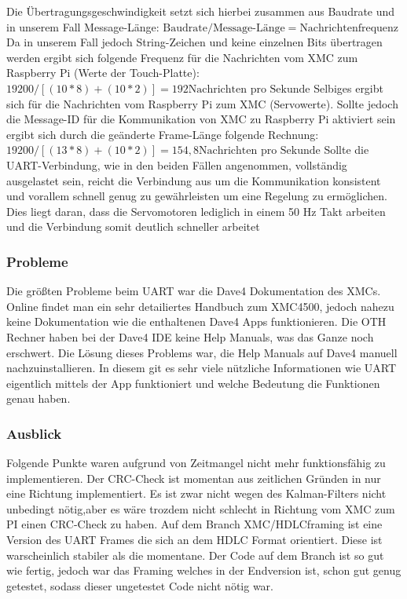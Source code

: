 \documentclass[12pt,a4paper,bibliography=totoc,listof=totoc]{scrartcl}
\begin{document}
Die Übertragungsgeschwindigkeit setzt sich hierbei zusammen aus Baudrate und in unserem Fall Message-Länge:\newline
$\text{Baudrate}/ \text{Message-Länge} = \text {Nachrichtenfrequenz} $\newline
Da in unserem Fall jedoch String-Zeichen und keine einzelnen Bits übertragen werden ergibt sich folgende Frequenz für 
die Nachrichten vom XMC zum Raspberry Pi (Werte der Touch-Platte):\newline
$ 19200/[(10*8)+(10*2)]= 192 \text {Nachrichten pro Sekunde}$\newline
Selbiges ergibt sich für die Nachrichten vom Raspberry Pi zum XMC (Servowerte). Sollte jedoch die Message-ID für die Kommunikation 
von XMC zu Raspberry Pi aktiviert sein ergibt sich durch die geänderte Frame-Länge folgende Rechnung:\newline
$19200 /[(13*8)+(10*2)]=154,8\text {Nachrichten pro Sekunde}$ \newline
Sollte die UART-Verbindung, wie in den beiden Fällen angenommen, vollständig ausgelastet sein, reicht die Verbindung aus um die 
Kommunikation konsistent und vorallem schnell genug zu gewährleisten um eine Regelung zu ermöglichen. Dies liegt daran, dass die 
Servomotoren lediglich in einem 50 Hz Takt arbeiten und die Verbindung somit deutlich schneller arbeitet


\subsubsection{Probleme}
Die größten Probleme beim UART war die Dave4 Dokumentation des XMCs. Online findet man ein sehr detailiertes Handbuch zum 
XMC4500, jedoch nahezu keine Dokumentation wie die enthaltenen Dave4 Apps funktionieren. Die OTH Rechner haben bei der Dave4 IDE keine 
Help Manuals, was das Ganze noch erschwert. Die Lösung dieses Problems war, die Help Manuals auf Dave4 manuell 
nachzuinstallieren. In diesem git es sehr viele nützliche Informationen wie UART eigentlich mittels der App funktioniert und welche Bedeutung die Funktionen genau haben.

\subsubsection{Ausblick}
Folgende Punkte waren aufgrund von Zeitmangel nicht mehr funktionsfähig zu implementieren.
Der CRC-Check ist momentan aus zeitlichen Gründen in nur eine Richtung implementiert. Es ist zwar nicht wegen des Kalman-Filters nicht unbedingt nötig,aber
 es wäre trozdem nicht schlecht in Richtung vom XMC zum PI einen CRC-Check zu haben. 
Auf dem Branch XMC/HDLCframing ist eine Version des UART Frames die sich an dem HDLC Format orientiert. Diese 
ist warscheinlich stabiler als die momentane. Der Code auf dem Branch ist so gut wie fertig, jedoch war das Framing welches 
in der Endversion ist, schon gut genug getestet, sodass dieser ungetestet Code nicht nötig war.
\end{document}

